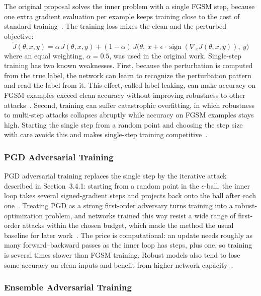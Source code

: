 \documentclass[12pt]{article}
\DeclareMathOperator{\sign}{sign}
\begin{document}
The original proposal solves the inner problem with a single FGSM step, because one extra gradient evaluation per example keeps training close to the cost of standard training~\cite{goodfellow2015}. The training loss mixes the clean and the perturbed objective:
\begin{equation}
  \tilde{J}(\theta, x, y) = \alpha\, J(\theta, x, y) + (1-\alpha)\, J\big(\theta,\ x + \epsilon \cdot \sign(\nabla_x J(\theta, x, y)),\ y\big)
\end{equation}
where an equal weighting, $\alpha = 0.5$, was used in the original work. Single-step training has two known weaknesses. First, because the perturbation is computed from the true label, the network can learn to recognize the perturbation pattern and read the label from it. This effect, called label leaking, can make accuracy on FGSM examples exceed clean accuracy without improving robustness to other attacks~\cite{kurakin2017scale}. Second, training can suffer catastrophic overfitting, in which robustness to multi-step attacks collapses abruptly while accuracy on FGSM examples stays high. Starting the single step from a random point and choosing the step size with care avoids this and makes single-step training competitive~\cite{wong2020}.

\subsubsection{PGD Adversarial Training}

PGD adversarial training replaces the single step by the iterative attack described in Section~3.4.1: starting from a random point in the $\epsilon$-ball, the inner loop takes several signed-gradient steps and projects back onto the ball after each one~\cite{madry2018}. Treating PGD as a strong first-order adversary turns training into a robust-optimization problem, and networks trained this way resist a wide range of first-order attacks within the chosen budget, which made the method the usual baseline for later work~\cite{madry2018}. The price is computational: an update needs roughly as many forward--backward passes as the inner loop has steps, plus one, so training is several times slower than FGSM training. Robust models also tend to lose some accuracy on clean inputs and benefit from higher network capacity~\cite{madry2018}.

\subsubsection{Ensemble Adversarial Training}
\end{document}
